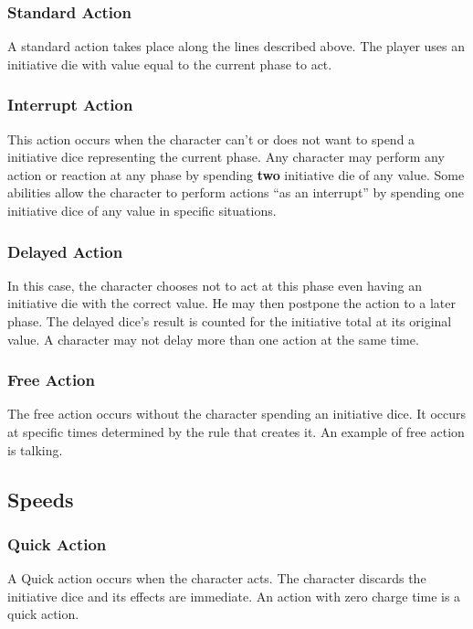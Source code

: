 \begin{multicols}{2}
\subsubsection{Standard Action}
A standard action takes place along the lines described above. The player uses an initiative die with value equal to the current phase to act.

\subsubsection{Interrupt Action}
This action occurs when the character can't or does not want to spend a initiative dice representing the current phase. Any character may perform any action or reaction at any phase by spending \textbf{two} initiative die of any value. Some abilities allow the character to perform actions “as an interrupt” by spending one initiative dice of any value in specific situations.

\subsubsection{Delayed Action}
In this case, the character chooses not to act at this phase even having an initiative die with the correct value. He may then postpone the action to a later phase. The delayed dice’s result is counted for the initiative total at its original value. A character may not delay more than one action at the same time.

\subsubsection{Free Action}
The free action occurs without the character spending an initiative dice. It occurs at specific times determined by the rule that creates it. An example of free action is talking.

\subsection{Speeds}\label{subsec:speeds}
\subsubsection{Quick Action}
A Quick action occurs when the character acts. The character discards the initiative dice and its effects are immediate. An action with zero charge time is a quick action.


\end{multicols}
